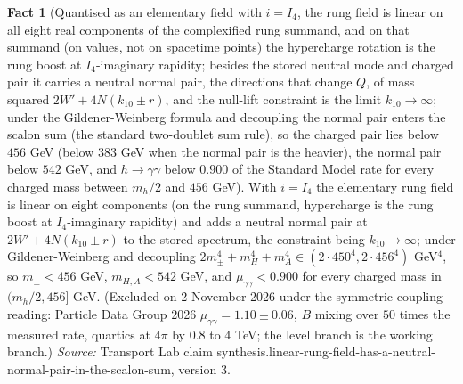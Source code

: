 \documentclass[11pt]{article}
\theoremstyle{definition}
\newtheorem{fact}[theorem]{Fact}
\theoremstyle{plain}
\begin{document}
\begin{fact}[Quantised as an elementary field with $i = I_{4}$, the rung field is linear on all eight real components of the complexified rung summand, and on that summand (on values, not on spacetime points) the hypercharge rotation is the rung boost at $I_{4}$-imaginary rapidity; besides the stored neutral mode and charged pair it carries a neutral normal pair, the directions that change $Q$, of mass squared $2W' + 4N(k_{10} \pm r)$, and the null-lift constraint is the limit $k_{10} \to \infty$; under the Gildener-Weinberg formula and decoupling the normal pair enters the scalon sum (the standard two-doublet sum rule), so the charged pair lies below $456$ GeV (below $383$ GeV when the normal pair is the heavier), the normal pair below $542$ GeV, and $h \to \gamma\gamma$ below $0.900$ of the Standard Model rate for every charged mass between $m_{h}/2$ and $456$ GeV]\label{c:synthesis.linear-rung-field-has-a-neutral-normal-pair-in-the-scalon-sum}
With $i = I_{4}$ the elementary rung field is linear on eight components (on the rung summand, hypercharge is the rung boost at $I_{4}$-imaginary rapidity) and adds a neutral normal pair at $2W' + 4N(k_{10} \pm r)$ to the stored spectrum, the constraint being $k_{10} \to \infty$; under Gildener-Weinberg and decoupling $2m_{\pm}^{4} + m_{H}^{4} + m_{A}^{4} \in (2 \cdot 450^{4}, 2 \cdot 456^{4})$ GeV$^{4}$, so $m_{\pm} < 456$ GeV, $m_{H,A} < 542$ GeV, and $\mu_{\gamma\gamma} < 0.900$ for every charged mass in $(m_{h}/2, 456]$ GeV. (Excluded on 2 November 2026 under the symmetric coupling reading: Particle Data Group 2026 $\mu_{\gamma\gamma} = 1.10 \pm 0.06$, $B$ mixing over $50$ times the measured rate, quartics at $4\pi$ by $0.8$ to $4$ TeV; the level branch is the working branch.)
\emph{Source:} Transport Lab claim synthesis.linear-rung-field-has-a-neutral-normal-pair-in-the-scalon-sum, version 3.
\end{fact}
\end{document}

